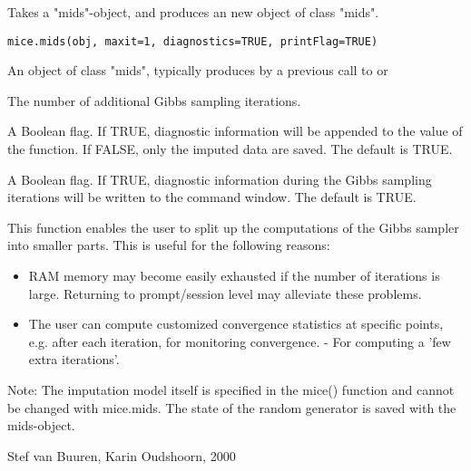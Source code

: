 \documentclass{article}
\begin{document}
\begin{Description}\relax
Takes a "mids"-object, and produces an new object of class "mids".
\end{Description}
\begin{Usage}
\begin{verbatim}
mice.mids(obj, maxit=1, diagnostics=TRUE, printFlag=TRUE)
\end{verbatim}
\end{Usage}
\begin{Arguments}
\begin{ldescription}
\item[\code{obj}] An object of class "mids", typically produces by a previous call
to  or  
\item[\code{maxit}] The number of additional Gibbs sampling iterations. 
\item[\code{diagnostics}] A Boolean flag. If TRUE, diagnostic information will be appended to 
the value of the function. If FALSE, only the imputed data are saved. 
The default is TRUE.
\item[\code{printFlag}] A Boolean flag. If TRUE, diagnostic information during the Gibbs sampling
iterations will be written to the command window.  The default is TRUE.
\end{ldescription}
\end{Arguments}
\begin{Details}\relax
This function enables the user to split up the computations of the 
Gibbs sampler into smaller parts. This is useful for the following
reasons:
\begin{itemize}
\item RAM memory may become easily exhausted if the number of iterations is 
large. Returning to prompt/session level may alleviate these problems.
\item The user can compute customized convergence statistics at specific
points, e.g. after each iteration, for monitoring convergence.
- For computing a 'few extra iterations'.
\end{itemize}
Note: The imputation model itself is specified in the mice() function
and cannot be changed with mice.mids.
The state of the random generator is saved with the mids-object.
\end{Details}
\begin{Author}\relax
Stef van Buuren, Karin Oudshoorn, 2000
\end{Author}
\end{document}

